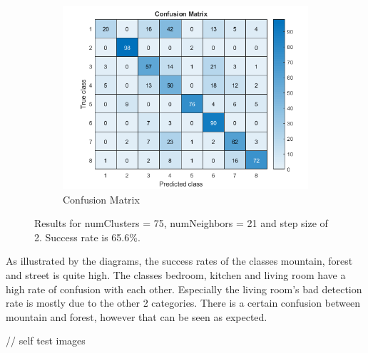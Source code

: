 \begin{figure}[h]
\begin{subfigure}{0.3\textwidth}
	\end{subfigure}
	\begin{subfigure}{0.65\textwidth}
		\includegraphics[width=\textwidth]{figures/confusion_75C_21NN_2S.png}
		\caption{Confusion Matrix}
	\end{subfigure}

	\caption{Results for numClusters = 75, numNeighbors = 21 and step size of 2. Success rate is 65.6\%.}
	\label{fig:a5:75c21nn2s}
\end{figure}

As illustrated by the diagrams, the success rates of the classes mountain, forest and street is quite high. The classes bedroom, kitchen and living room have a high rate of confusion with each other. Especially the living room's bad detection rate is mostly due to the other 2 categories. There is a certain confusion between mountain and forest, however that can be seen as expected.

// self test images